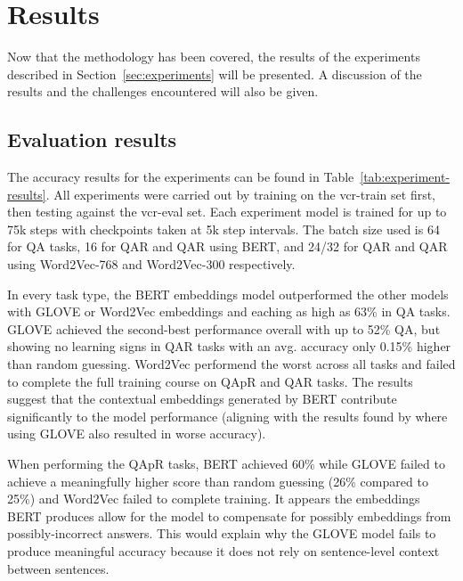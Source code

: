 \chapter{Results}
\label{chp:results}

Now that the methodology has been covered, the results of the experiments described in Section~\ref{sec:experiments} will be presented.
A discussion of the results and the challenges encountered will also be given.

\section{Evaluation results}
\label{sec:evaluation-results}

The accuracy results for the experiments can be found in Table~\ref{tab:experiment-results}.
All experiments were carried out by training on the vcr-train set first, then testing against the vcr-eval set.
Each experiment model is trained for up to 75k steps with checkpoints taken at 5k step intervals.
The batch size used is 64 for Q\rightarrow{}A tasks, 16 for QA\rightarrow{}R and Q\rightarrow{}AR using BERT, and 24/32 for QA\rightarrow{}R and Q\rightarrow{}AR using Word2Vec-768 and Word2Vec-300 respectively.

In every task type, the BERT embeddings model outperformed the other models with GLOVE or Word2Vec embeddings and eaching as high as 63\% in Q\rightarrow{}A tasks.
GLOVE achieved the second-best performance overall with up to 52\% Q\rightarrow{}A, but showing no learning signs in Q\rightarrow{}AR tasks with an avg. accuracy only 0.15\% higher than random guessing.
Word2Vec performend the worst across all tasks and failed to complete the full training course on QAp\rightarrow{}R and Q\rightarrow{}AR tasks.
The results suggest that the contextual embeddings generated by BERT contribute significantly to the model performance (aligning with the results found by \citeauthor{zellers_recognition_2019} where using GLOVE also resulted in worse accuracy\cite{zellers_recognition_2019}).

When performing the QAp\rightarrow{}R tasks, BERT achieved 60\% while GLOVE failed to achieve a meaningfully higher score than random guessing (26\% compared to 25\%) and Word2Vec failed to complete training.
It appears the embeddings BERT produces allow for the model to compensate for possibly embeddings from possibly-incorrect answers.
This would explain why the GLOVE model fails to produce meaningful accuracy because it does not rely on sentence-level context between sentences.


